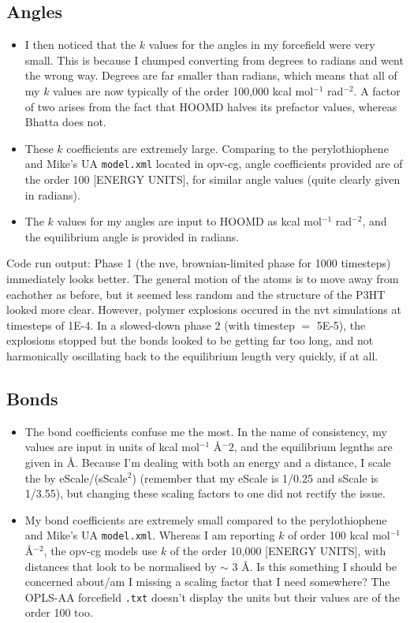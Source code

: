 \documentclass[12pt]{article}
\begin{document}
\subsection{Angles}
\begin{itemize}
\item{I then noticed that the $k$ values for the angles in my forcefield were very small. This is because I chumped converting from degrees to radians and went the wrong way. Degrees are far smaller than radians, which means that all of my $k$ values are now typically of the order 100,000 kcal mol$^{-1}$ rad$^{-2}$. A factor of two arises from the fact that HOOMD halves its prefactor values, whereas Bhatta does not.}
\item{These $k$ coefficients are extremely large. Comparing to the perylothiophene and Mike's UA \verb|model.xml| located in opv-cg, angle coefficients provided are of the order 100 [ENERGY UNITS], for similar angle values (quite clearly given in radians).}
\item{The $k$ values for my angles are input to HOOMD as kcal mol$^{-1}$ rad$^{-2}$, and the equilibrium angle is provided in radians.}
\end{itemize}


Code run output: Phase 1 (the nve, brownian-limited phase for 1000 timesteps) immediately looks better. The general motion of the atoms is to move away from eachother as before, but it seemed less random and the structure of the P3HT looked more clear. However, polymer explosions occured in the nvt simulations at timesteps of 1E-4. In a slowed-down phase 2 (with timestep $=$ 5E-5), the explosions stopped but the bonds looked to be getting far too long, and not harmonically oscillating back to the equilibrium length very quickly, if at all.


\subsection{Bonds}
\begin{itemize}
\item{The bond coefficients confuse me the most. In the name of consistency, my values are input in units of kcal mol$^{-1}$ \AA ${^-2}$, and the equilibrium legnths are given in \AA. Because I'm dealing with both an energy and a distance, I scale the by eScale/(sScale$^{2}$) (remember that my eScale is 1/0.25 and sScale is 1/3.55), but changing these scaling factors to one did not rectify the issue.}
\item{My bond coefficients are extremely small compared to the perylothiophene and Mike's UA \verb|model.xml|. Whereas I am reporting $k$ of order 100 kcal mol$^{-1}$ \AA$^{-2}$, the opv-cg models use $k$ of the order 10,000 [ENERGY UNITS], with distances that look to be normalised by $\sim$ 3 \AA. Is this something I should be concerned about/am I missing a scaling factor that I need somewhere? The OPLS-AA forcefield \verb|.txt| doesn't display the units but their values are of the order 100 too.} 
\end{itemize}
\end{document}
